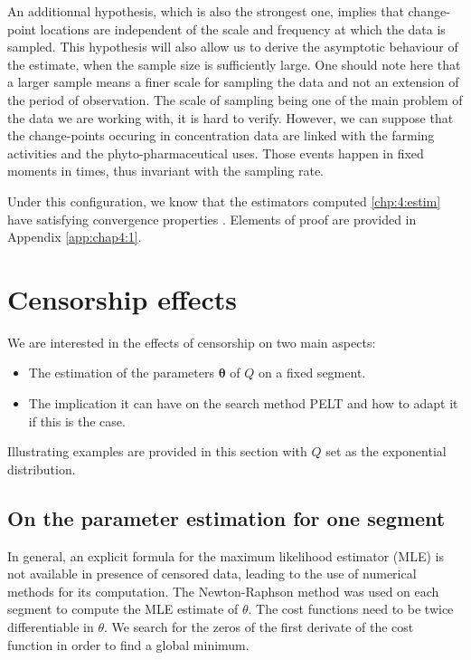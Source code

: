 An additionnal hypothesis, which is also the strongest one, implies that change-point locations are independent of the scale and frequency at which the data is sampled. This hypothesis will also allow us to derive the asymptotic behaviour of the estimate, when the sample size is sufficiently large. One should note here that a larger sample means a finer scale for sampling the data and not an extension of the period of observation. The scale of sampling being one of the main problem of the data we are working with, it is hard to verify. However, we can suppose that the change-points occuring in concentration data are linked with the farming activities and the phyto-pharmaceutical uses. Those events happen in fixed moments in times, thus invariant with the sampling rate. 

Under this configuration, we know that the estimators computed \ref{chp:4:estim} have satisfying convergence properties \citep{Lavielle1997}. Elements of proof are provided in Appendix \ref{app:chap4:1}.

\section{Censorship effects}\label{chp:4:2}

We are interested in the effects of censorship on two main aspects: 
\begin{itemize}
\item The estimation of the parameters $\bm \theta$ of $Q$ on a fixed segment. 
\item The implication it can have on the search method PELT and how to adapt it if this is the case. 
\end{itemize} 
Illustrating examples are provided in this section with $Q$ set as the exponential distribution.

\subsection{On the parameter estimation for one segment}\label{chp:4:cens_seg}

In general, an explicit formula for the maximum likelihood estimator (MLE) is not available in presence of censored data, leading to the use of numerical methods for its computation. The Newton-Raphson method was used on each segment to compute the MLE estimate of $\theta$. The cost functions need to be twice differentiable in $\theta$. We search for the zeros of the first derivate of the cost function in order to find a global minimum. 

